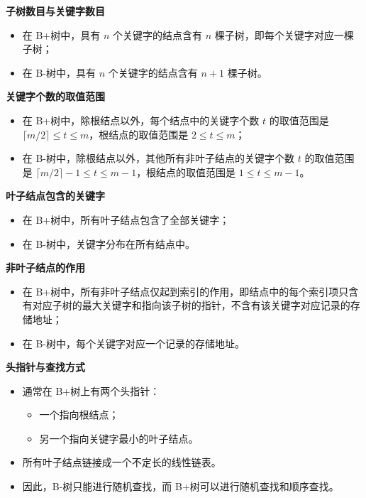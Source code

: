 \documentclass[lang=cn,newtx,10pt,scheme=chinese]{elegantbook}
\begin{document}
\textbf{子树数目与关键字数目}  

   \begin{itemize}
     \item 在 B+树中，具有 $n$ 个关键字的结点含有 $n$ 棵子树，即每个关键字对应一棵子树；
     \item 在 B-树中，具有 $n$ 个关键字的结点含有 $n+1$ 棵子树。
   \end{itemize}

\textbf{关键字个数的取值范围} 

   \begin{itemize}
     \item 在 B+树中，除根结点以外，每个结点中的关键字个数 $t$ 的取值范围是 $\lceil m/2 \rceil \leq t \leq m$，根结点的取值范围是 $2 \leq t \leq m$；
     \item 在 B-树中，除根结点以外，其他所有非叶子结点的关键字个数 $t$ 的取值范围是 $\lceil m/2 \rceil - 1 \leq t \leq m-1$，根结点的取值范围是 $1 \leq t \leq m-1$。
   \end{itemize}

\textbf{叶子结点包含的关键字}

   \begin{itemize}
     \item 在 B+树中，所有叶子结点包含了全部关键字；
     \item 在 B-树中，关键字分布在所有结点中。
   \end{itemize}

\textbf{非叶子结点的作用}  

   \begin{itemize}
     \item 在 B+树中，所有非叶子结点仅起到索引的作用，即结点中的每个索引项只含有对应子树的最大关键字和指向该子树的指针，不含有该关键字对应记录的存储地址；
     \item 在 B-树中，每个关键字对应一个记录的存储地址。
   \end{itemize}

   \textbf{头指针与查找方式}  

   \begin{itemize}
     \item 通常在 B+树上有两个头指针：
       \begin{itemize}
         \item 一个指向根结点；
         \item 另一个指向关键字最小的叶子结点。
       \end{itemize}
     \item 所有叶子结点链接成一个不定长的线性链表。
     \item 因此，B-树只能进行随机查找，而 B+树可以进行随机查找和顺序查找。
   \end{itemize}
\end{document}
